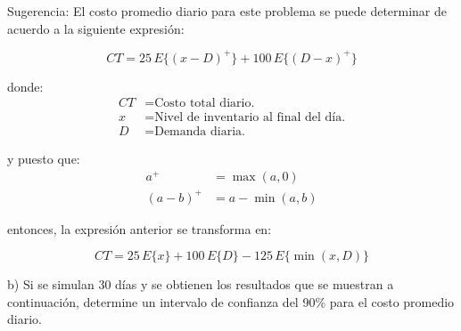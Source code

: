 \documentclass[11pt,letterpaper]{report}
\begin{document}
\begin{enumerate}
Sugerencia: El costo promedio diario para este problema se puede
determinar de acuerdo a la siguiente expresión:

\begin{equation}
CT = 25\,E\{(x-D)^+\} + 100\,E\{(D-x)^+\}
\end{equation}

donde:
\begin{align*}
CT &= \text{Costo total diario.} \\
x &= \text{Nivel de inventario al final del día.} \\
D &= \text{Demanda diaria.}
\end{align*}

y puesto que:
\begin{align*}
a^+ &= \max(a,0) \\
(a-b)^+ &= a - \min(a,b)
\end{align*}

entonces, la expresión anterior se transforma en:

\begin{equation}
CT = 25\,E\{x\} + 100\,E\{D\} - 125\,E\{\min(x,D)\}
\end{equation}

b) Si se simulan 30 días y se obtienen los resultados que se muestran a
continuación, determine un intervalo de confianza del 90\% para el
costo promedio diario.
\end{enumerate}
\end{document}
